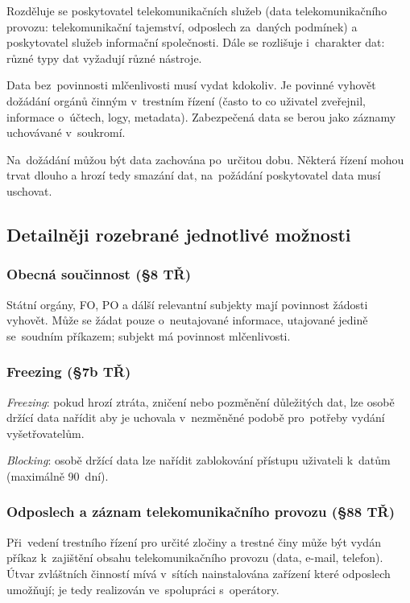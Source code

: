 Rozděluje se poskytovatel telekomunikačních služeb (data telekomunikačního provozu: telekomunikační tajemství, odposlech za~daných podmínek) a poskytovatel služeb informační společnosti.
Dále se rozlišuje i~charakter dat: různé typy dat vyžadují různé nástroje.

Data bez~povinnosti mlčenlivosti musí vydat kdokoliv.
Je povinné vyhovět dožádání orgánů činným v~trestním řízení (často to co uživatel zveřejnil, informace o~účtech, logy, metadata).
Zabezpečená data se berou jako záznamy uchovávané v~soukromí.

Na~dožádání můžou být data zachována po~určitou dobu.
Některá řízení mohou trvat dlouho a hrozí tedy smazání dat, na~požádání poskytovatel data musí uschovat.


\subsection{Detailněji rozebrané jednotlivé možnosti}

\subsubsection{Obecná součinnost (§8 TŘ)}

Státní orgány, FO, PO a dálší relevantní subjekty mají povinnost žádosti vyhovět.
Může se žádat pouze o~neutajované informace, utajované jedině se~soudním příkazem; subjekt má povinnost mlčenlivosti.


\subsubsection{Freezing (§7b TŘ)}

\emph{Freezing}: pokud hrozí ztráta, zničení nebo pozměnění důležitých dat, lze osobě držící data nařídit aby je uchovala v~nezměněné podobě pro~potřeby vydání vyšetřovatelům.

\emph{Blocking}: osobě držící data lze nařídit zablokování přístupu uživateli k~datům (maximálně 90~dní).

\subsubsection{Odposlech a záznam telekomunikačního provozu (§88 TŘ)}

Při~vedení trestního řízení pro určité zločiny a trestné činy může být vydán příkaz k~zajištění obsahu telekomunikačního provozu (data, e-mail, telefon).
Útvar zvláštních činností mívá v~sítích nainstalována zařízení které odposlech umožňují; je tedy realizován ve~spolupráci s~operátory.

